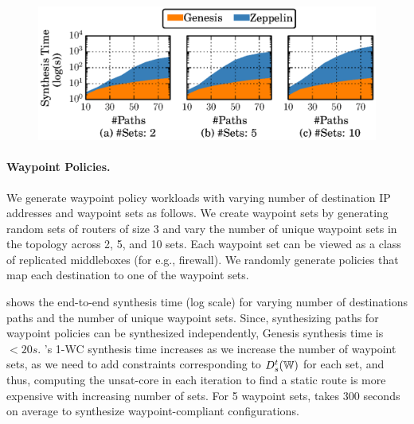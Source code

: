 
\begin{figure}
	\begin{center}
		\includegraphics[width=0.6\columnwidth]{figures/ospfwaypoint.eps}
	\end{center} 
\end{figure}
\paragraph{Waypoint Policies.}
We generate waypoint policy 
workloads with varying number of destination IP addresses and 
waypoint sets as follows. We create waypoint sets by generating
random sets of routers of size 3 and vary the number of 
unique waypoint sets in the topology across 2, 5, and 10 sets. 
Each waypoint set can be 
viewed as a class of replicated middleboxes (for e.g., firewall).
We randomly generate policies that map each destination to one of the waypoint sets. 


 shows the end-to-end synthesis
 time (log scale) for varying number of destinations paths and the 
 number of unique waypoint sets. Since, synthesizing paths
 for waypoint policies can be synthesized independently,
Genesis synthesis time is $<20s$. \name's 1-WC synthesis 
time increases as we increase the number of waypoint sets,
as we need to add constraints corresponding to $D_s^t(\mathbb{W})$ 
for each set, and thus, computing the unsat-core in each
iteration to find a static route is more expensive with increasing
number of sets. For 5 waypoint sets, \name takes 300 
seconds on average to synthesize waypoint-compliant configurations. 


